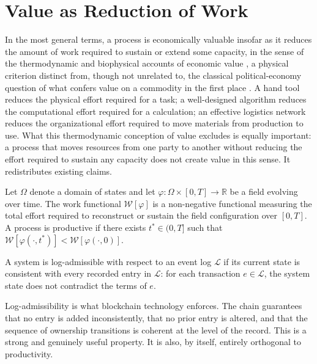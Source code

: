 \section{Value as Reduction of Work}

In the most general terms, a process is economically valuable insofar as it reduces the amount of work required to sustain or extend some capacity, in the sense of the thermodynamic and biophysical accounts of economic value \cite{georgescu1971,odum1996,ayres2009}, a physical criterion distinct from, though not unrelated to, the classical political-economy question of what confers value on a commodity in the first place \cite{smith1776,marx1867}. A hand tool reduces the physical effort required for a task; a well-designed algorithm reduces the computational effort required for a calculation; an effective logistics network reduces the organizational effort required to move materials from production to use. What this thermodynamic conception of value excludes is equally important: a process that moves resources from one party to another without reducing the effort required to sustain any capacity does not create value in this sense. It redistributes existing claims.

\begin{definition}
Let $\Omega$ denote a domain of states and let $\varphi : \Omega \times [0,T] \to \mathbb{R}$ be a field evolving over time. The work functional $\mathcal{W}[\varphi]$ is a non-negative functional measuring the total effort required to reconstruct or sustain the field configuration over $[0,T]$. A process is productive if there exists $t^\ast \in (0,T]$ such that $\mathcal{W}[\varphi(\cdot,t^\ast)] < \mathcal{W}[\varphi(\cdot,0)]$.
\end{definition}

\begin{definition}
A system is log-admissible with respect to an event log $\mathcal{L}$ if its current state is consistent with every recorded entry in $\mathcal{L}$: for each transaction $e \in \mathcal{L}$, the system state does not contradict the terms of $e$.
\end{definition}

Log-admissibility is what blockchain technology enforces. The chain guarantees that no entry is added inconsistently, that no prior entry is altered, and that the sequence of ownership transitions is coherent at the level of the record. This is a strong and genuinely useful property. It is also, by itself, entirely orthogonal to productivity.

